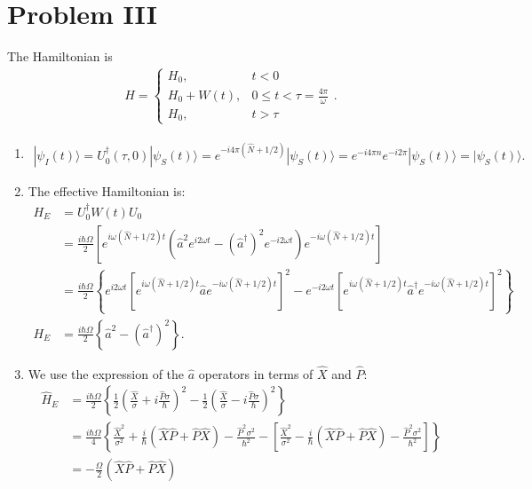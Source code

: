 \documentclass[letterpaper,11pt,twoside]{article}
\newcommand{\ket}[1]{|#1\rangle}
\begin{document}
\section*{Problem III}
The Hamiltonian is 
\begin{align*}
  H=\begin{cases}
    H_0,&t<0\\
    H_0+W(t),&0\leq t<\tau=\frac{4\pi}{\omega}\\
    H_0,&t>\tau
  \end{cases}.
\end{align*}
\begin{enumerate}[itemsep=0pt,topsep=0pt,label=\alph*)]
  \item
  \begin{align*}
    \ket{\psi_I(t)}=U_0^\dagger(\tau,0)\ket{\psi_S(t)}=e^{-i4\pi(\hat{N}+1/2)}\ket{\psi_S(t)}=e^{-i4\pi n}e^{-i2\pi}\ket{\psi_S(t)}=\ket{\psi_S(t)}.
  \end{align*}
  \item The effective Hamiltonian is:
  \begin{align*}
    H_E&=U_0^\dagger W(t)U_0\\
    &=\frac{i\hbar\Omega}{2}\left[e^{i\omega(\hat{N}+1/2)t}(\hat{a}^2e^{i2\omega t}-(\hat{a}^\dagger)^2e^{-i2\omega t})e^{-i\omega(\hat{N}+1/2)t}\right]\\
    &=\frac{i\hbar\Omega}{2}\left\{e^{i2\omega t}[e^{i\omega(\hat{N}+1/2)t}\hat{a}e^{-i\omega(\hat{N}+1/2)t}]^2-e^{-i2\omega t}[e^{i\omega(\hat{N}+1/2)t}\hat{a}^\dagger e^{-i\omega(\hat{N}+1/2)t}]^2\right\}\\
    H_E&=\frac{i\hbar\Omega}{2}\left\{\hat{a}^2-(\hat{a}^\dagger)^2\right\}.
  \end{align*}
  \item We use the expression of the $\hat{a}$ operators in terms of $\hat{X}$ and $\hat{P}$:
  \begin{align*}
    \hat{H}_E&=\frac{i\hbar\Omega}{2}\left\{\frac{1}{2}\left(\frac{\hat{X}}{\sigma}+i\frac{\hat{P}\sigma}{\hbar}\right)^2-\frac{1}{2}\left(\frac{\hat{X}}{\sigma}-i\frac{\hat{P}\sigma}{\hbar}\right)^2\right\}\\
    &=\frac{i\hbar\Omega}{4}\left\{\frac{\hat{X}^2}{\sigma^2}+\frac{i}{\hbar}(\hat{X}\hat{P}+\hat{P}\hat{X})-\frac{\hat{P}^2\sigma^2}{\hbar^2}-\left[\frac{\hat{X}^2}{\sigma^2}-\frac{i}{\hbar}(\hat{X}\hat{P}+\hat{P}\hat{X})-\frac{\hat{P}^2\sigma^2}{\hbar^2}\right]\right\}\\
    &=-\frac{\Omega}{2}(\hat{X}\hat{P}+\hat{P}\hat{X})\\

\end{align*}
\end{enumerate}
\end{document}
